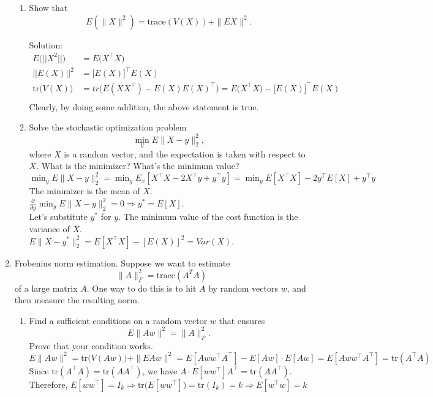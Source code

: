 \documentclass[12pt]{article}
\newcommand{\tr}{\mathrm{tr}}
\begin{document}
\begin{enumerate}
\begin{enumerate}
\item Show that 
\[
E(\|X\|^2) = \mbox{trace}(V(X))  + \|EX\|^2.
\]
\null

\noindent
Solution: \\
\begin{align*}
E \big( ||X^2|| \big) &= E \big (X^\top X \big) \\
|| E(X) || ^2 &= \big[ E(X) \big]^\top E(X) \\
\tr \Big( V(X) \Big ) &= tr \Big( E(XX^\top) - E(X) E(X)^\top \Big) = E \big(X^\top X \big) -\big[ E(X) \big]^\top E(X)\\
\end{align*}
Clearly, by doing some addition, the above statement is true.\\

\item Solve the stochastic optimization problem 
\[
\min_y E\|X - y\|_2^2,
\]
where $X$ is a random vector, and the expectation is taken with respect to $X$.
What is the minimizer? What's the minimum value? \\

\noindent
$\min_y E\|X - y\|_2^2 = \min_y E_x [X^\top X - 2X^\top y + y^\top y] = \min_y E[X^\top X] - 2y^\top E[X] + y^\top y$ \\


\noindent
The minimizer is the mean of $X$. \\
$\frac{\partial}{\partial y} \min_y E\|X - y\|_2^2 = 0 \Rightarrow y^* = E[X]$.\\  

\noindent
Let's substitute $y^*$ for $y$.  The minimum value of the cost function is the variance of $X$. \\
$E\|X - y^*\|_2^2 = E[X^\top X] - [E(X)]^2 = Var(X)$.  \\
\end{enumerate}

\item Frobenius norm estimation. Suppose we want to estimate 
\[
\|A\|_F^2 = \mbox{trace}(A^TA)
\]
of a large matrix $A$. One way to do this is to hit $A$ by random vectors $w$, and then measure 
the resulting norm. 
\begin{enumerate}
\item Find a sufficient conditions on a random vector $w$  that ensures 
\[
E \|Aw\|^2 = \|A\|_F^2.
\]
Prove that your condition works. \\

\noindent
$E \|Aw\|^2 = \tr \Big(V(Aw)\Big) + \|E Aw \|^2 = E [Aw w^\top A^\top ] - E[Aw] \cdot E[Aw] = E[Aw w^\top A^\top] = \tr(A^\top A) $\\
Since $\tr(A^\top A) = \tr(AA^\top)$, we have $A \cdot E[w w^\top] A^\top = \tr(A A^\top)$. \\
Therefore, $E[w w^\top] = I_k \Rightarrow \tr \Big(E[w w^\top] \Big) = \tr(I_k) = k \Rightarrow E[w^\top w] = k$ \\


\end{enumerate}
\end{enumerate}
\end{document}
